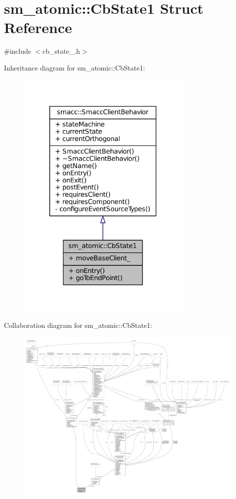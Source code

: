 \hypertarget{structsm__atomic_1_1CbState1}{}\section{sm\+\_\+atomic\+:\+:Cb\+State1 Struct Reference}
\label{structsm__atomic_1_1CbState1}


{\ttfamily \#include $<$cb\+\_\+state\+\_.\+h$>$}



Inheritance diagram for sm\+\_\+atomic\+:\+:Cb\+State1\+:
\nopagebreak
\begin{figure}[H]
\begin{center}
\leavevmode
\includegraphics[width=242pt]{structsm__atomic_1_1CbState1__inherit__graph}
\end{center}
\end{figure}


Collaboration diagram for sm\+\_\+atomic\+:\+:Cb\+State1\+:
\nopagebreak
\begin{figure}[H]
\begin{center}
\leavevmode
\includegraphics[width=350pt]{structsm__atomic_1_1CbState1__coll__graph}
\end{center}
\end{figure}
